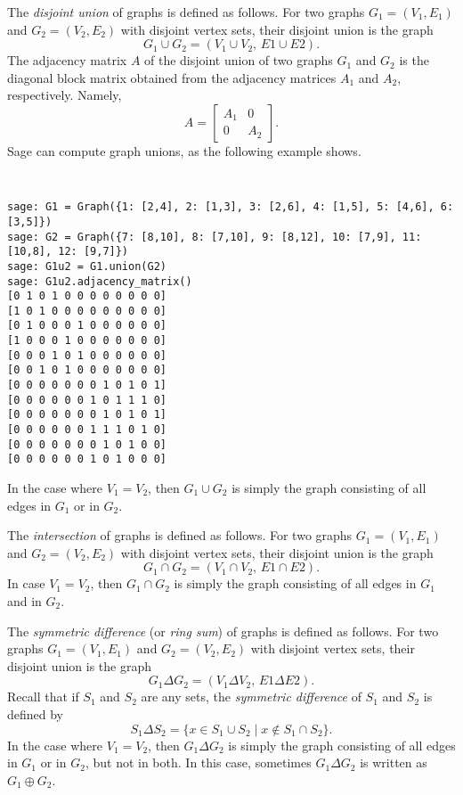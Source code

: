 The \emph{disjoint union} of graphs is defined as follows. For two
graphs $G_1 = (V_1, E_1)$ and $G_2 = (V_2, E_2)$ with disjoint vertex
sets, their disjoint union is the graph
\[
G_1 \cup G_2
=
(V_1 \cup V_2,\, E1 \cup E2).
\]
The adjacency matrix $A$ of the disjoint union of two graphs $G_1$ and
$G_2$ is the diagonal block matrix obtained from the adjacency
matrices $A_1$ and $A_2$, respectively. Namely,
\[
A
=
\begin{bmatrix}
A_1 & 0 \\
0 & A_2
\end{bmatrix}.
\]
%
Sage can compute graph unions, as the following example shows.
%
\begin{center}
\fontsize{9pt}{9pt}
\selectfont
\tt
\begin{lstlisting}
sage: G1 = Graph({1: [2,4], 2: [1,3], 3: [2,6], 4: [1,5], 5: [4,6], 6: [3,5]})
sage: G2 = Graph({7: [8,10], 8: [7,10], 9: [8,12], 10: [7,9], 11: [10,8], 12: [9,7]})
sage: G1u2 = G1.union(G2)
sage: G1u2.adjacency_matrix()
[0 1 0 1 0 0 0 0 0 0 0 0]
[1 0 1 0 0 0 0 0 0 0 0 0]
[0 1 0 0 0 1 0 0 0 0 0 0]
[1 0 0 0 1 0 0 0 0 0 0 0]
[0 0 0 1 0 1 0 0 0 0 0 0]
[0 0 1 0 1 0 0 0 0 0 0 0]
[0 0 0 0 0 0 0 1 0 1 0 1]
[0 0 0 0 0 0 1 0 1 1 1 0]
[0 0 0 0 0 0 0 1 0 1 0 1]
[0 0 0 0 0 0 1 1 1 0 1 0]
[0 0 0 0 0 0 0 1 0 1 0 0]
[0 0 0 0 0 0 1 0 1 0 0 0]
\end{lstlisting}
\end{center}
%
In the case where $V_1 = V_2$, then $G_1 \cup G_2$ is simply the graph
consisting of all edges in $G_1$ or in $G_2$.

The \emph{intersection} of graphs is defined as follows. For two
graphs $G_1 = (V_1, E_1)$ and $G_2 = (V_2, E_2)$ with disjoint vertex
sets, their disjoint union is the graph
\[
G_1 \cap G_2
=
(V_1 \cap V_2,\, E1 \cap E2).
\]
In case $V_1 = V_2$, then $G_1 \cap G_2$ is simply the graph
consisting of all edges in $G_1$ and in $G_2$.

The \emph{symmetric difference} (or \emph{ring sum}) of graphs is
defined as follows. For two graphs $G_1 = (V_1, E_1)$ and
$G_2 = (V_2, E_2)$ with disjoint vertex sets, their disjoint union is
the graph
\[
G_1 \Delta G_2
=
(V_1 \Delta V_2,\, E1 \Delta E2).
\]
Recall that if $S_1$ and $S_2$ are any sets, the
\emph{symmetric difference} of $S_1$ and $S_2$ is defined by
\[
S_1 \Delta S_2
=
\{x \in S_1 \cup S_2 \;|\; x \notin S_1 \cap S_2\}.
\]
In the case where $V_1 = V_2$, then $G_1 \Delta G_2$ is simply the
graph consisting of all edges in $G_1$ or in $G_2$, but not in
both. In this case, sometimes $G_1 \Delta G_2$ is written as
$G_1 \oplus G_2$.

